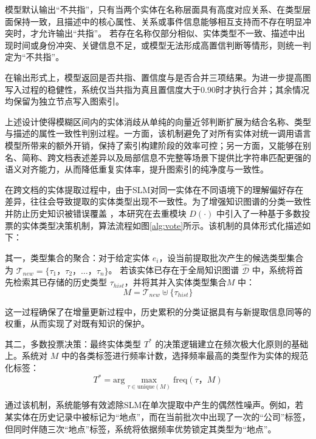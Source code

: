 \documentclass[promaster, vlined]{DissertUESTC}
\begin{document}
模型默认输出“不共指”，只有当两个实体在名称层面具有高度对应关系、在类型层面保持一致，且描述中的核心属性、关系或事件信息能够相互支持而不存在明显冲突时，才允许输出“共指”。
若存在名称仅部分相似、实体类型不一致、描述中出现时间或身份冲突、关键信息不足，或模型无法形成高置信判断等情形，则统一判定为“不共指”。

在输出形式上，模型返回是否共指、置信度与是否合并三项结果。为进一步提高图写入过程的稳健性，系统仅当共指为真且置信度大于0.90时才执行合并；其余情况均保留为独立节点写入图索引。

上述设计使得模糊区间内的实体消歧从单纯的向量近邻判断扩展为结合名称、类型与描述的属性一致性判别过程。一方面，该机制避免了对所有实体对统一调用语言模型所带来的额外开销，保持了索引构建阶段的效率可控；另一方面，又能够在别名、简称、跨文档表述差异以及局部信息不完整等场景下提供比字符串匹配更强的语义对齐能力，从而降低重复实体率，提升图索引的纯净度与一致性。


在跨文档的实体提取过程中，由于SLM对同一实体在不同语境下的理解偏好存在差异，往往会导致提取的实体类型出现不一致性。为了增强知识图谱的分类一致性并防止历史知识被错误覆盖 ，本研究在去重模块 $D(\cdot)$ 中引入了一种基于多数投票的实体类型决策机制，算法流程如图\ref{alg:vote}所示。该机制的具体形式化描述如下：

其一，类型集合的聚合：对于给定实体 $e_i$，设当前提取批次产生的候选类型集合为 $\mathcal{T}_{new} = \{\tau_1， \tau_2， \dots， \tau_n\}$。
若该实体已存在于全局知识图谱 $\hat{\mathcal{D}}$ 中，系统将首先检索其已存储的历史类型 $\tau_{hist}$，并将其并入实体类型集合$M$ 中：
\begin{equation}
M = \mathcal{T}_{new} \uplus \{\tau_{hist}\}
\end{equation}

这一过程确保了在增量更新过程中，历史累积的分类证据具有与新提取信息同等的权重，从而实现了对既有知识的保护。


其二，多数投票决策：最终实体类型 $T^*$ 的决策逻辑建立在频次极大化原则的基础上。系统对 $M$ 中的各类标签进行频率计数，选择频率最高的类型作为实体的规范化标签：
\begin{equation}
T^* = \text{arg}\max_{\tau \in \text{unique}(M)} \text{freq}(\tau， M)
\end{equation}

通过该机制，系统能够有效滤除SLM在单次提取中产生的偶然性噪声。例如，若某实体在历史记录中被标记为“地点”，而在当前批次中出现了一次的“公司”标签，但同时伴随三次“地点”标签，系统将依据频率优势锁定其类型为“地点”。
\end{document}
